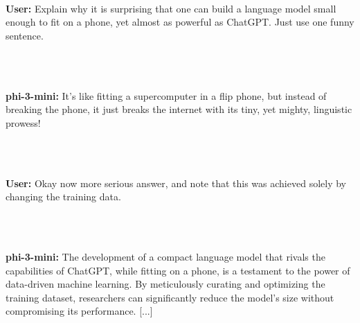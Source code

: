 \documentclass[11pt]{article}
\begin{document}
\begin{AIbox}{}
\tt \footnotesize 
\begin{minipage}[t]{0.99\linewidth}
\textbf{User:} Explain why it is surprising that one can build a language model small enough to fit on a phone, yet almost as powerful as ChatGPT. Just use one funny sentence.
\end{minipage}
\\ \\
\begin{minipage}[t]{0.99\linewidth}
\textbf{phi-3-mini:} It's like fitting a supercomputer in a flip phone, but instead of breaking the phone, it just breaks the internet with its tiny, yet mighty, linguistic prowess!
\end{minipage}
\\ \\
\begin{minipage}[t]{0.99\linewidth}
\textbf{User:}  Okay now more serious answer, and note that this was achieved solely by changing the training data.
\end{minipage}
\\ \\
\begin{minipage}[t]{0.99\linewidth}
\textbf{phi-3-mini:} The development of a compact language model that rivals the capabilities of ChatGPT, while fitting on a phone, is a testament to the power of data-driven machine learning. By meticulously curating and optimizing the training dataset, researchers can significantly reduce the model's size without compromising its performance. [...]
\end{minipage}
\end{AIbox}
\end{document}
